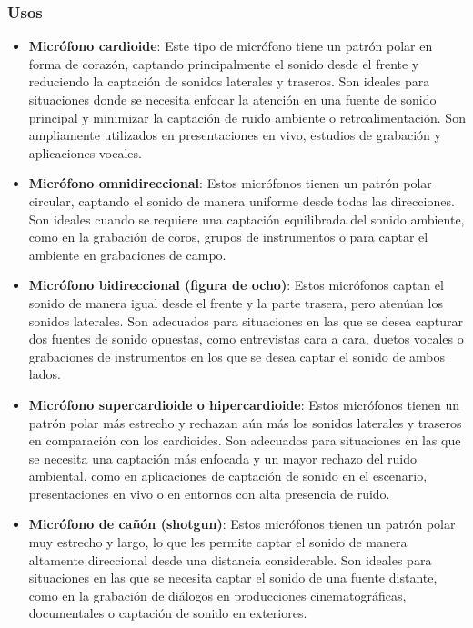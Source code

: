 \documentclass[
	12pt, %
	fleqn, %
	a4paper, %
	oneside, %
]{LegrandOrangeBook}
\begin{document}
\subsubsection*{Usos}
\begin{itemize}
\item \textbf{Micrófono cardioide}: Este tipo de micrófono tiene un patrón polar en forma de corazón, captando principalmente el sonido desde el frente y reduciendo la captación de sonidos laterales y traseros. Son ideales para situaciones donde se necesita enfocar la atención en una fuente de sonido principal y minimizar la captación de ruido ambiente o retroalimentación. Son ampliamente utilizados en presentaciones en vivo, estudios de grabación y aplicaciones vocales.

\item \textbf{Micrófono omnidireccional}: Estos micrófonos tienen un patrón polar circular, captando el sonido de manera uniforme desde todas las direcciones. Son ideales cuando se requiere una captación equilibrada del sonido ambiente, como en la grabación de coros, grupos de instrumentos o para captar el ambiente en grabaciones de campo.

\item \textbf{Micrófono bidireccional (figura de ocho)}: Estos micrófonos captan el sonido de manera igual desde el frente y la parte trasera, pero atenúan los sonidos laterales. Son adecuados para situaciones en las que se desea capturar dos fuentes de sonido opuestas, como entrevistas cara a cara, duetos vocales o grabaciones de instrumentos en los que se desea captar el sonido de ambos lados.

\item \textbf{Micrófono supercardioide o hipercardioide}: Estos micrófonos tienen un patrón polar más estrecho y rechazan aún más los sonidos laterales y traseros en comparación con los cardioides. Son adecuados para situaciones en las que se necesita una captación más enfocada y un mayor rechazo del ruido ambiental, como en aplicaciones de captación de sonido en el escenario, presentaciones en vivo o en entornos con alta presencia de ruido.

\item \textbf{Micrófono de cañón (shotgun)}: Estos micrófonos tienen un patrón polar muy estrecho y largo, lo que les permite captar el sonido de manera altamente direccional desde una distancia considerable. Son ideales para situaciones en las que se necesita captar el sonido de una fuente distante, como en la grabación de diálogos en producciones cinematográficas, documentales o captación de sonido en exteriores.

\end{itemize}
\end{document}
